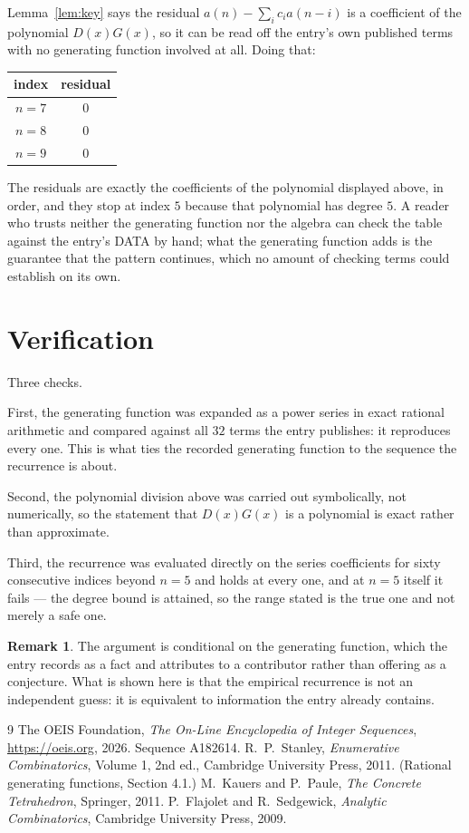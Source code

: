 \documentclass[11pt,a4paper]{article}
\theoremstyle{plain}
\theoremstyle{definition}
\newtheorem{remark}[theorem]{Remark}
\begin{document}
Lemma~\ref{lem:key} says the residual $a(n)-\sum_ic_ia(n-i)$ is a coefficient of the
polynomial $D(x)G(x)$, so it can be read off the entry's own published terms with no
generating function involved at all. Doing that:
\begin{center}
\begin{tabular}{cc}
index & residual \\ \hline
$n=7$ & $0$ \\
$n=8$ & $0$ \\
$n=9$ & $0$
\end{tabular}
\end{center}
The residuals are exactly the coefficients of the polynomial displayed above, in order, and
they stop at index $5$ because that polynomial has degree $5$. A reader who trusts
neither the generating function nor the algebra can check the table against the entry's DATA
by hand; what the generating function adds is the guarantee that the pattern continues, which
no amount of checking terms could establish on its own.

\section{Verification}

Three checks.

First, the generating function was expanded as a power series in exact rational arithmetic and
compared against all $32$ terms the entry publishes: it reproduces every one. This is
what ties the recorded generating function to the sequence the recurrence is about.

Second, the polynomial division above was carried out symbolically, not numerically, so the
statement that $D(x)G(x)$ is a polynomial is exact rather than approximate.

Third, the recurrence was evaluated directly on the series coefficients for sixty consecutive
indices beyond $n=5$ and holds at every one, and at $n=5$ itself it fails --- the
degree bound is attained, so the range stated is the true one and not merely a safe one.

\begin{remark}
The argument is conditional on the generating function, which the entry records as a fact and
attributes to a contributor rather than offering as a conjecture. What is shown here is that
the empirical recurrence is not an independent guess: it is equivalent to information the
entry already contains.
\end{remark}

\begin{thebibliography}{9}
 The OEIS Foundation, \emph{The On-Line Encyclopedia of Integer
Sequences}, \url{https://oeis.org}, 2026. Sequence A182614.
 R.~P.~Stanley, \emph{Enumerative Combinatorics}, Volume 1, 2nd ed.,
Cambridge University Press, 2011. (Rational generating functions, Section 4.1.)
 M.~Kauers and P.~Paule, \emph{The Concrete Tetrahedron}, Springer, 2011.
 P.~Flajolet and R.~Sedgewick, \emph{Analytic Combinatorics}, Cambridge
University Press, 2009.
\end{thebibliography}
\end{document}
